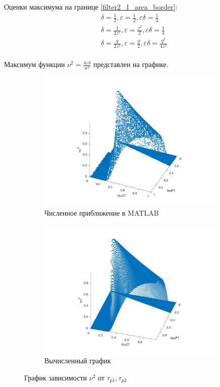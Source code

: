 \documentclass[a4paper,14pt]{extarticle} %
\begin{document}
Оценки максимума на границе \eqref{filter2_1_area_border}:
  \begin{equation}
 \begin{aligned}
&\delta = \frac{1}{2}, \varepsilon = \frac{1}{2}, \varepsilon\delta = \frac{1}{4}\\
&\delta = \frac{1}{2z^2}, \varepsilon = \frac{z^2}{2}, \varepsilon\delta = \frac{1}{4}\\
&\delta = \frac{q}{2z^2}, \varepsilon = \frac{q}{2}, \varepsilon\delta = \frac{q^2}{4z^2}\\
 \end{aligned}
\end{equation}

  Максимум функции $\nu^2 = \frac{4\varepsilon\delta}{\varkappa^2}$ представлен на графике.
  \begin{figure}[H]
\begin{subfigure}{.5\textwidth}
  \includegraphics[width=9cm]{images/filter2_tau0_1e.jpg}
  \caption{Численное приближение в MATLAB}
  \label{filter2:sub1}
\end{subfigure}%
 \begin{subfigure}{.5\textwidth}
  \includegraphics[width=9cm]{images/filter2_tau0_1.jpg}
  \caption{Вычисленный график}
  \label{filter2:sub2}
\end{subfigure}%
\caption{График зависимости $\nu^2$ от $\tau_{p1}, \tau_{p2}$}
\label{filter2:filter2_fig}
\end{figure}
\end{document}
